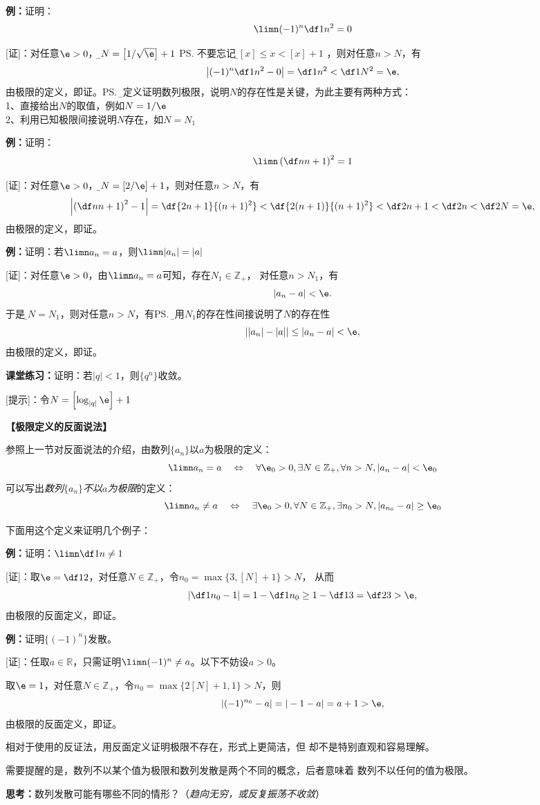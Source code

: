 {\bf 例：}证明：
$$\limn(-1)^n\df1{n^2}=0$$

[证]：对任意$\e>0$，{\b 令$N=\left[1/\sqrt{\e}\right]+1$}
\ps{不要忘记：\b $[x]\leq x<[x]+1$}
，则对任意$n>N$，有
$$\left|(-1)^n\df1{n^2}-0\right|=\df1{n^2}<\df1{N^2}=\e,$$
由极限的定义，即证。\ps{\b 用定义证明数列极限，说明$N$的存在性是关键，为此主要有两种方式：\\
1、直接给出$N$的取值，例如$N=1/\e$\\
2、利用已知极限间接说明$N$存在，如$N=N_1$}

{\bf 例：}证明：
$$\limn\left(\df n{n+1}\right)^2=1$$

[证]：对任意$\e>0$，{\b 令$N=\left[2/\e\right]+1$}，则对任意$n>N$，有
$$\left|\left(\df
n{n+1}\right)^2-1\right|=\df{2n+1}{(n+1)^2}<\df{2(n+1)}{(n+1)^2}
<\df2{n+1}<\df2n<\df2N=\e,$$
由极限的定义，即证。

{\bf 例：}证明：若$\limn a_n=a$，则$\limn|a_n|=|a|$

[证]：对任意$\e>0$，由$\limn a_n=a$可知，存在$N_1\in\mathbb{Z}_+$，
对任意$n>N_1$，有
$$|a_n-a|<\e.$$
于是{\b 令$N=N_1$}，则对任意$n>N$，有\ps{\b 利用$N_1$的存在性间接说明了$N$的存在性}
$$||a_n|-|a||\leq|a_n-a|<\e,$$
由极限的定义，即证。

{\bf 课堂练习：}证明：若$|q|<1$，则$\{q^n\}$收敛。

[提示]：令$N=\left[\log_{|q|}\e\right]+1$

% 

\begin{shaded}
	{\bf 【极限定义的反面说法】}
	
	参照上一节对反面说法的介绍，由数列$\{a_n\}$以$a$为极限的定义：
	$$\limn a_n= a\quad\Leftrightarrow\quad\forall\e_0>0,
	\exists N\in\mathbb{Z}_+,\forall n>N,|a_n-a|<\e_0$$
	可以写出{\it 数列$\{a_n\}$不以$a$为极限}的定义：
	$$\limn a_n\neq a\quad\Leftrightarrow\quad\exists\e_0>0,
	\forall N\in\mathbb{Z}_+,\exists n_0>N,|a_{n_0}-a|\geq\e_0$$
	
	下面用这个定义来证明几个例子：
	
	{\bf 例：}证明：$\limn\df 1n\neq 1$
	
	[证]：取$\e=\df12$，对任意$N\in\mathbb{Z}_+$，令$n_0=\max\{3,[N]+1\}>N$，
	从而
	$$\left|\df1{n_0}-1\right|=1-\df1{n_0}\geq 1-\df13=\df23>\e,$$
	由极限的反面定义，即证。
	
	{\bf 例：}证明$\{(-1)^n\}$发散。
	
	[证]：任取$a\in\mathbb{R}$，只需证明$\limn(-1)^n\ne a$。以下不妨设$a>0$。
	
	取$\e=1$，对任意$N\in\mathbb{Z}_+$，令$n_0=\max\{2[N]+1,1\}>N$，则
	$$\left|(-1)^{n_0}-a\right|=|-1-a|=a+1>\e,$$
	由极限的反面定义，即证。
	
	相对于使用的反证法，用反面定义证明极限不存在，形式上更简洁，但
	却不是特别直观和容易理解。
	
	需要提醒的是，数列不以某个值为极限和数列发散是两个不同的概念，后者意味着
	数列不以任何的值为极限。
	
	{\bf 思考：}数列发散可能有哪些不同的情形？\hfill（{\it 趋向无穷，或反复振荡不收敛}）
\end{shaded}

